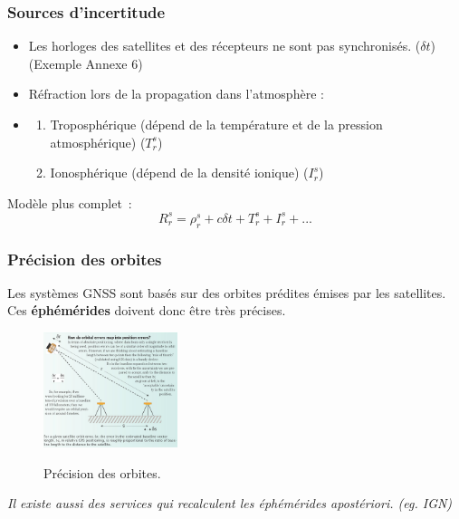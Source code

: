 \documentclass[xcolor=dvipsnames,envcountsect]{beamer}
\begin{document}
\begin{frame}
	\frametitle{Sources d'incertitude}
	\justifying
	\begin{itemize}
		\item Les horloges des satellites et des récepteurs ne sont pas synchronisés. ($\delta t$) {\tiny (Exemple Annexe 6)}
		\item Réfraction lors de la propagation dans l’atmosphère :
		\item \begin{enumerate}
			\item Troposphérique (dépend de la température et de la pression atmosphérique) ($T_r^s$)
			\item Ionosphérique (dépend de la densité ionique) ($I_r^s$)
		\end{enumerate}
	\end{itemize}
	Modèle plus complet :
	\begin{equation}
		\boxed{R_r^s = \rho_r^s + c\delta t + T_r^s + I_r^s + ...}
	\end{equation}
\end{frame}
\begin{frame}
	\frametitle{Précision des orbites}
	\justifying
	Les systèmes GNSS sont basés sur des orbites prédites émises par les satellites. \\
	Ces \textbf{éphémérides} doivent donc être très précises. 
	\begin{figure}
		\centering
		\includegraphics[width=0.35\textwidth]{./Figures/ENS_gnss2.png} \\
		\caption {Précision des orbites. \cite{ens}}
	\end{figure}
	{\small	\textit{Il existe aussi des services qui recalculent les éphémérides apostériori. (eg. IGN)}}
\end{frame}
\end{document}
